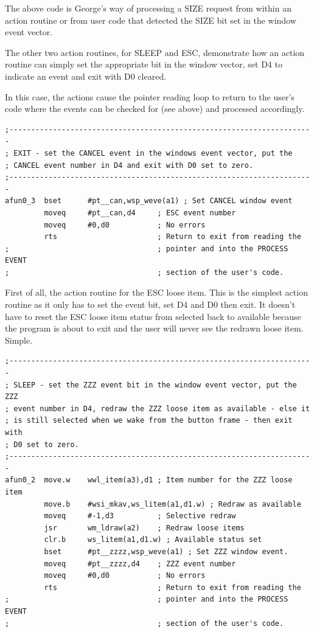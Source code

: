 The above code is George's way of processing a SIZE request from within an
        action routine or from user code that detected the SIZE bit set in the window
        event vector.

The other two action routines, for SLEEP and ESC, demonstrate how an action
        routine can simply set the appropriate bit in the window vector, set D4 to
        indicate an event and exit with D0 cleared.

In this case, the actions cause the pointer reading loop to return to the
        user's code where the events can be checked for (see above) and processed
        accordingly.

\begin{lstlisting}[firstnumber=last,caption={Ex0 - EXIT Loose Item Action Routine}]
;----------------------------------------------------------------------
; EXIT - set the CANCEL event in the windows event vector, put the 
; CANCEL event number in D4 and exit with D0 set to zero.
;----------------------------------------------------------------------
afun0_3  bset      #pt__can,wsp_weve(a1) ; Set CANCEL window event
         moveq     #pt__can,d4     ; ESC event number
         moveq     #0,d0           ; No errors
         rts                       ; Return to exit from reading the 
;                                  ; pointer and into the PROCESS EVENT 
;                                  ; section of the user's code.
\end{lstlisting}

First of all, the action routine for the ESC loose item. This is the
        simplest action routine as it only has to set the event bit, set D4 and D0 then
        exit. It doesn't have to reset the ESC loose item status from selected back to
        available because the program is about to exit and the user will never see the
        redrawn loose item. Simple.

\begin{lstlisting}[firstnumber=last,caption={Ex0 - SLEEP Loose Item Action Routine}]
;----------------------------------------------------------------------
; SLEEP - set the ZZZ event bit in the window event vector, put the ZZZ
; event number in D4, redraw the ZZZ loose item as available - else it
; is still selected when we wake from the button frame - then exit with
; D0 set to zero.
;----------------------------------------------------------------------
afun0_2  move.w    wwl_item(a3),d1 ; Item number for the ZZZ loose item
         move.b    #wsi_mkav,ws_litem(a1,d1.w) ; Redraw as available
         moveq     #-1,d3          ; Selective redraw
         jsr       wm_ldraw(a2)    ; Redraw loose items
         clr.b     ws_litem(a1,d1.w) ; Available status set
         bset      #pt__zzzz,wsp_weve(a1) ; Set ZZZ window event.
         moveq     #pt__zzzz,d4    ; ZZZ event number
         moveq     #0,d0           ; No errors
         rts                       ; Return to exit from reading the 
;                                  ; pointer and into the PROCESS EVENT 
;                                  ; section of the user's code.
\end{lstlisting}

